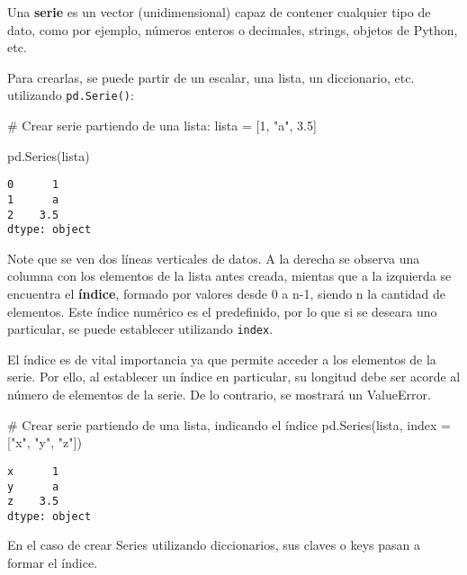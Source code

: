 \documentclass[
  letterpaper,
  DIV=11,
  numbers=noendperiod]{scrreprt}
\newenvironment{Shaded}{\begin{snugshade}}{\end{snugshade}}
\newcommand{\CommentTok}[1]{\textcolor[rgb]{0.37,0.37,0.37}{#1}}
\newcommand{\DecValTok}[1]{\textcolor[rgb]{0.68,0.00,0.00}{#1}}
\newcommand{\FloatTok}[1]{\textcolor[rgb]{0.68,0.00,0.00}{#1}}
\newcommand{\NormalTok}[1]{\textcolor[rgb]{0.00,0.23,0.31}{#1}}
\newcommand{\OperatorTok}[1]{\textcolor[rgb]{0.37,0.37,0.37}{#1}}
\newcommand{\StringTok}[1]{\textcolor[rgb]{0.13,0.47,0.30}{#1}}
\begin{document}
Una \textbf{serie} es un vector (unidimensional) capaz de contener
cualquier tipo de dato, como por ejemplo, números enteros o decimales,
strings, objetos de Python, etc.

Para crearlas, se puede partir de un escalar, una lista, un diccionario,
etc. utilizando \texttt{pd.Serie()}:

\begin{Shaded}
\begin{Highlighting}[]
\CommentTok{\# Crear serie partiendo de una lista:}
\NormalTok{lista }\OperatorTok{=}\NormalTok{ [}\DecValTok{1}\NormalTok{, }\StringTok{"a"}\NormalTok{, }\FloatTok{3.5}\NormalTok{]}

\NormalTok{pd.Series(lista)}
\end{Highlighting}
\end{Shaded}

\begin{verbatim}
0      1
1      a
2    3.5
dtype: object
\end{verbatim}

Note que se ven dos líneas verticales de datos. A la derecha se observa
una columna con los elementos de la lista antes creada, mientas que a la
izquierda se encuentra el \textbf{índice}, formado por valores desde 0 a
n-1, siendo n la cantidad de elementos. Este índice numérico es el
predefinido, por lo que si se deseara uno particular, se puede
establecer utilizando \texttt{index}.

El índice es de vital importancia ya que permite acceder a los elementos
de la serie. Por ello, al establecer un índice en particular, su
longitud debe ser acorde al número de elementos de la serie. De lo
contrario, se mostrará un ValueError.

\begin{Shaded}
\begin{Highlighting}[]
\CommentTok{\# Crear serie partiendo de una lista, indicando el índice}
\NormalTok{pd.Series(lista, index }\OperatorTok{=}\NormalTok{ [}\StringTok{"x"}\NormalTok{, }\StringTok{"y"}\NormalTok{, }\StringTok{"z"}\NormalTok{])}
\end{Highlighting}
\end{Shaded}

\begin{verbatim}
x      1
y      a
z    3.5
dtype: object
\end{verbatim}

En el caso de crear Series utilizando diccionarios, sus claves o keys
pasan a formar el índice.
\end{document}
